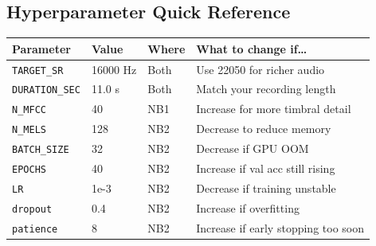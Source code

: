 \documentclass[12pt,a4paper]{article}
\begin{document}
\subsection{Hyperparameter Quick Reference}

\begin{center}
\begin{tabular}{llll}
\toprule
\textbf{Parameter} & \textbf{Value} & \textbf{Where} & \textbf{What to change if\ldots} \\
\midrule
\texttt{TARGET\_SR} & 16000 Hz & Both & Use 22050 for richer audio \\
\texttt{DURATION\_SEC} & 11.0 s & Both & Match your recording length \\
\texttt{N\_MFCC} & 40 & NB1 & Increase for more timbral detail \\
\texttt{N\_MELS} & 128 & NB2 & Decrease to reduce memory \\
\texttt{BATCH\_SIZE} & 32 & NB2 & Decrease if GPU OOM \\
\texttt{EPOCHS} & 40 & NB2 & Increase if val acc still rising \\
\texttt{LR} & 1e-3 & NB2 & Decrease if training unstable \\
\texttt{dropout} & 0.4 & NB2 & Increase if overfitting \\
\texttt{patience} & 8 & NB2 & Increase if early stopping too soon \\
\bottomrule
\end{tabular}
\end{center}
\end{document}
